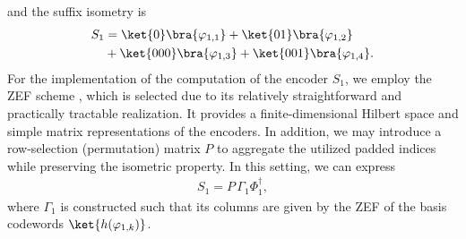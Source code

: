 \documentclass[conference]{IEEEtran}
\begin{document}
and the suffix isometry is
\begin{align*}    S_1&=\ket{0}\bra{\varphi_{1,1}}+\ket{01}\bra{\varphi_{1,2}} \\
&+\ket{000}\bra{\varphi_{1,3}}+\ket{001}\bra{\varphi_{1,4}}.
\end{align*}
For the implementation of the computation of the encoder $S_1$, we employ the ZEF scheme \cite{PhysRevA.65.032313, SchumacherWestmoreland2001}, which is selected due to its relatively straightforward and practically tractable realization. It provides a finite-dimensional Hilbert space and simple matrix representations of the encoders. In addition, we may introduce a row-selection (permutation) matrix \(P\) to aggregate the utilized padded indices while preserving the isometric property. In this setting, we can express
\begin{align*}
    S_1 = P\,\Gamma_1 \Phi_1^{\dagger},
\end{align*}
where \(\Gamma_1\) is constructed such that its columns are given by the ZEF of the basis codewords \(\ket{h(\varphi_{1,k})}\).
\end{document}
